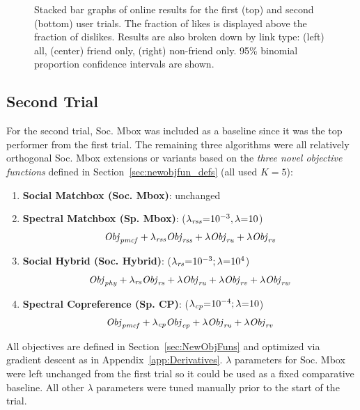\begin{figure}[t!]
\vspace{-2mm}
\caption{Stacked bar graphs of online results for the first (top)
and second (bottom) user trials.  The fraction of likes is displayed
above the fraction of dislikes.  Results are also broken down by link
type: (left) all, (center) friend only, (right) non-friend only.  95\%
binomial proportion confidence intervals are shown.}
\label{fig:trial_results}
\end{figure}


\subsection{Second Trial} 

For the second trial, Soc. Mbox 
was included as a baseline since it was the top performer
from the first trial.  The remaining three algorithms
were all relatively orthogonal Soc. Mbox extensions or variants 
based on the \emph{three novel objective functions} defined in 
Section~\ref{sec:newobjfun_defs} (all used $K=5$):
\denselist
\begin{enumerate}
\item {\bf Social Matchbox (Soc. Mbox)}: unchanged
\item {\bf Spectral Matchbox \sq (Sp. \sq Mbox)}: \sq ($\lambda_{\mathit{rss}}\hspace{-.9mm}=\hspace{-.9mm} 10^{-3}, \lambda\hspace{-.9mm}=\hspace{-.9mm} 10$)
$$\mathit{Obj}_{\mathit{pmcf}} + \lambda_{\mathit{rss}} \mathit{Obj}_{\mathit{rss}} + \lambda \mathit{Obj}_{\mathit{ru}} + \lambda \mathit{Obj}_{\mathit{rv}}$$
\item {\bf Social Hybrid (Soc. Hybrid)}: ($\lambda_{\mathit{rs}} \hspace{-.9mm} = \hspace{-.9mm} 10^{-3}; \lambda \hspace{-.9mm} = \hspace{-.9mm} 10^4$) 
$$\mathit{Obj}_{\mathit{phy}} + \lambda_{\mathit{rs}} \mathit{Obj}_{\mathit{rs}} + \lambda \mathit{Obj}_{\mathit{ru}} + \lambda \mathit{Obj}_{\mathit{rv}} + \lambda \mathit{Obj}_{\mathit{rw}}$$
\item {\bf Spectral \sqt Copreference \sq (Sp. \sq CP)}: \sql ($\lambda_{\mathit{cp}} \hspace{-.9mm} = \hspace{-.9mm} 10^{-4}; \lambda \hspace{-.9mm} = \hspace{-.9mm} 10$)
$$\mathit{Obj}_{\mathit{pmcf}} + \lambda_{\mathit{cp}} \mathit{Obj}_{\mathit{cp}} + \lambda \mathit{Obj}_{\mathit{ru}} + \lambda \mathit{Obj}_{\mathit{rv}}$$
\end{enumerate}
All objectives are defined in Section~\ref{sec:NewObjFuns} 
and optimized via gradient descent as in Appendix~\ref{app:Derivatives}. 
$\lambda$ parameters for Soc. Mbox were left unchanged from the first
trial so it could be used as a fixed comparative
baseline.  All other $\lambda$ parameters were tuned manually
prior to the start of the trial.

